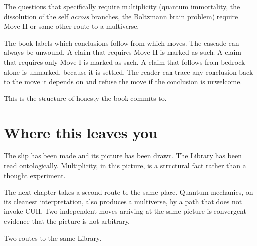 The questions that specifically require multiplicity (quantum immortality, the dissolution of the self \emph{across} branches, the Boltzmann brain problem) require Move II or some other route to a multiverse.

The book labels which conclusions follow from which moves. The cascade can always be unwound. A claim that requires Move II is marked as such. A claim that requires only Move I is marked as such. A claim that follows from bedrock alone is unmarked, because it is settled. The reader can trace any conclusion back to the move it depends on and refuse the move if the conclusion is unwelcome.

This is the structure of honesty the book commits to.

\section*{Where this leaves you}

The slip has been made and its picture has been drawn. The Library has been read ontologically. Multiplicity, in this picture, is a structural fact rather than a thought experiment.

The next chapter takes a second route to the same place. Quantum mechanics, on its cleanest interpretation, also produces a multiverse, by a path that does not invoke CUH. Two independent moves arriving at the same picture is convergent evidence that the picture is not arbitrary.

Two routes to the same Library.

